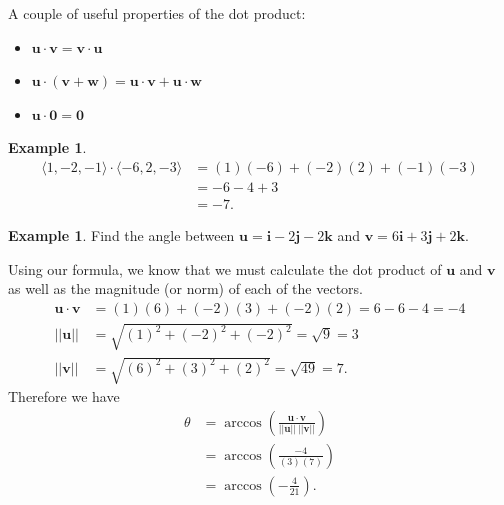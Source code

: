 \documentclass[12pt, letter]{article}
\theoremstyle{plain}
\numberwithin{theorem}{section}
\theoremstyle{definition}
\newtheorem{example}[theorem]{Example}
\begin{document}
\bigskip

A couple of useful properties of the dot product:
\begin{itemize}
\item $\bm{u} \cdot \bm{v} = \bm{v} \cdot \bm{u}$
\item $\bm{u} \cdot (\bm{v}+\bm{w}) = \bm{u} \cdot \bm{v} + \bm{u} \cdot \bm{w}$
\item $\bm{u} \cdot \bm{0} = \bm{0}$
\end{itemize}

\bigskip

\hrulefill

\bigskip

\begin{example}
\begin{align*}
\langle 1, -2, -1 \rangle \cdot \langle -6, 2, -3 \rangle &= (1)(-6) + (-2)(2) + (-1)(-3)\\
& = -6-4+3\\
&= -7.
\end{align*}
\end{example}

\bigskip

\hrulefill

\bigskip

\begin{example}
Find the angle between $\bm{u} = \bm{i} - 2\bm{j} - 2\bm{k}$ and $\bm{v} = 6\bm{i}+3\bm{j}+2\bm{k}$.\\

\smallskip

Using our formula, we know that we must calculate the dot product of $\bm{u}$ and $\bm{v}$ as well as the magnitude (or norm) of each of the vectors.
\begin{align*}
\bm{u}\cdot\bm{v} &= (1)(6)+(-2)(3)+(-2)(2) = 6-6-4 = -4\\
||\bm{u}|| &= \sqrt{(1)^2+(-2)^2+(-2)^2} = \sqrt{9} = 3\\
||\bm{v}|| &= \sqrt{(6)^2+(3)^2+(2)^2} = \sqrt{49} = 7.
\end{align*}
Therefore we have
\begin{align*}
\theta &= \arccos\left(\frac{\bm{u}\cdot\bm{v}}{||\bm{u}|| \ ||\bm{v}||}\right)\\
&= \arccos\left(\frac{-4}{(3)(7)}\right)\\
&= \arccos\left(-\frac{4}{21}\right).
\end{align*}
\end{example}

\bigskip
\end{document}
